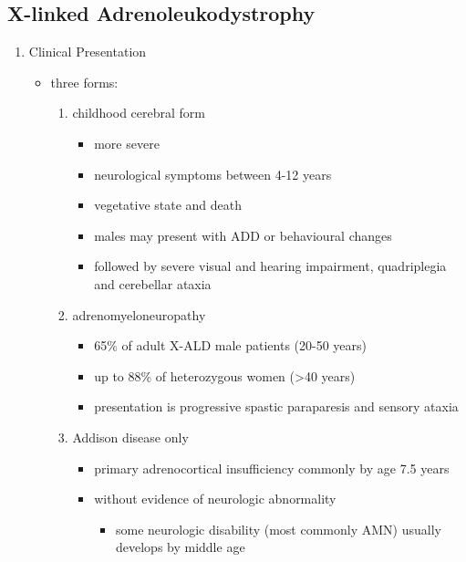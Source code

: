 \documentclass{scrartcl}
\begin{document}
\subsection{X-linked Adrenoleukodystrophy}
\label{sec:orgb3a799b}
\begin{enumerate}
\item Clinical Presentation
\label{sec:org13f5131}
\begin{itemize}
\item three forms:
\begin{enumerate}
\item childhood cerebral form
\begin{itemize}
\item more severe
\item neurological symptoms between 4-12 years
\item vegetative state and death
\item males may present with ADD or behavioural changes
\item followed by severe visual and hearing impairment, quadriplegia and
cerebellar ataxia
\end{itemize}
\item adrenomyeloneuropathy
\begin{itemize}
\item 65\% of adult X-ALD male patients (20-50 years)
\item up to 88\% of heterozygous women (\textgreater{}40 years)
\item presentation is progressive spastic paraparesis and sensory ataxia
\end{itemize}
\item Addison disease only
\begin{itemize}
\item primary adrenocortical insufficiency commonly by age 7.5 years
\item without evidence of neurologic abnormality
\begin{itemize}
\item some neurologic disability (most commonly AMN) usually
develops by middle age
\end{itemize}
\end{itemize}
\end{enumerate}
\end{itemize}


\end{enumerate}
\end{document}
